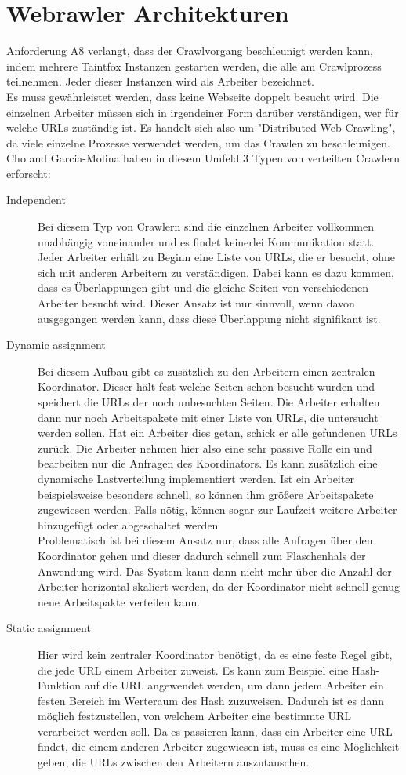 \section{Webrawler Architekturen}
Anforderung A8 verlangt, dass der Crawlvorgang beschleunigt werden kann, indem mehrere Taintfox Instanzen gestarten werden, die alle am Crawlprozess teilnehmen. Jeder dieser Instanzen wird als Arbeiter bezeichnet. \\
Es muss gewährleistet werden, dass keine Webseite doppelt besucht wird. Die einzelnen Arbeiter müssen sich in irgendeiner Form darüber verständigen, wer für welche URLs zuständig ist. 
Es handelt sich also um "Distributed Web Crawling", da viele einzelne Prozesse verwendet werden, um das Crawlen zu beschleunigen. 
Cho and Garcia-Molina haben in diesem Umfeld 3 Typen von verteilten Crawlern erforscht: %
\begin{description}
	\item[Independent] 
	Bei diesem Typ von Crawlern sind die einzelnen Arbeiter vollkommen unabhängig voneinander und es findet keinerlei Kommunikation statt. Jeder Arbeiter erhält zu Beginn eine Liste von URLs, die er besucht, ohne sich mit anderen Arbeitern zu verständigen. Dabei kann es dazu kommen, dass es Überlappungen gibt und die gleiche Seiten von verschiedenen Arbeiter besucht wird. Dieser Ansatz ist nur sinnvoll, wenn davon ausgegangen werden kann, dass diese Überlappung nicht signifikant ist.
	\item[Dynamic assignment]
	Bei diesem Aufbau gibt es zusätzlich zu den Arbeitern einen zentralen Koordinator. Dieser hält fest welche Seiten schon besucht wurden und speichert die URLs der noch unbesuchten Seiten. Die Arbeiter erhalten dann nur noch Arbeitspakete mit einer Liste von URLs, die untersucht werden sollen. Hat ein Arbeiter dies getan, schick er alle gefundenen URLs zurück. Die Arbeiter nehmen hier also eine sehr passive Rolle ein und bearbeiten nur die Anfragen des Koordinators. Es kann zusätzlich eine dynamische Lastverteilung implementiert werden. Ist ein Arbeiter beispielsweise besonders schnell, so können ihm größere Arbeitspakete zugewiesen werden. Falls nötig, können sogar zur Laufzeit weitere Arbeiter hinzugefügt oder abgeschaltet werden\\
	Problematisch ist bei diesem Ansatz nur, dass alle Anfragen über den Koordinator gehen und dieser dadurch schnell zum Flaschenhals der Anwendung wird. Das System kann dann nicht mehr über die Anzahl der Arbeiter horizontal skaliert werden, da der Koordinator nicht schnell genug neue Arbeitspakte verteilen kann.
	\item[Static assignment] 
	Hier wird kein zentraler Koordinator benötigt, da es eine feste Regel gibt, die jede URL einem Arbeiter zuweist. Es kann zum Beispiel eine Hash-Funktion auf die URL angewendet werden, um dann jedem Arbeiter ein festen Bereich im Werteraum des Hash zuzuweisen. Dadurch ist es dann möglich festzustellen, von welchem Arbeiter eine bestimmte URL verarbeitet werden soll. Da es passieren kann, dass ein Arbeiter eine URL findet, die einem anderen Arbeiter zugewiesen ist, muss es eine Möglichkeit geben, die URLs zwischen den Arbeitern auszutauschen.
\end{description}

